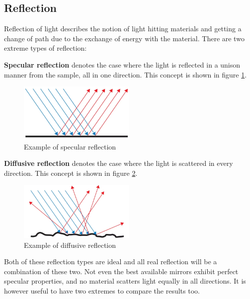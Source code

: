 \subsection{Reflection}
\label{sec:theory_reflection}
Reflection of light describes the notion of light hitting materials and getting a change of path due to the exchange of energy with the material. There are two extreme types of reflection:

\textbf{Specular reflection} denotes the case where the light is reflected in a unison manner from the sample, all in one direction. This concept is shown in figure \ref{fig:specular_reflection}.

\begin{figure}[h!]
    \centering
    \includegraphics[width=0.5\textwidth]{figures/theory/Specular-Reflection.png}
    \caption{Example of specular reflection \cite{SpecularReflectionOcean}}
    \label{fig:specular_reflection}
\end{figure}

\textbf{Diffusive reflection} denotes the case where the light is scattered in every direction. This concept is shown in figure \ref{fig:diffusive_reflection}.

\begin{figure}[h!]
    \centering
    \includegraphics[width=0.5\textwidth]{figures/theory/Diffuse-Reflection.png}
    \caption{Example of diffusive reflection \cite{DiffuseReflectionOcean}}
    \label{fig:diffusive_reflection}
\end{figure}

Both of these reflection types are ideal and all real reflection will be a combination of these two. Not even the best available mirrors exhibit perfect specular properties, and no material scatters light equally in all directions. It is however useful to have two extremes to compare the results too. 


